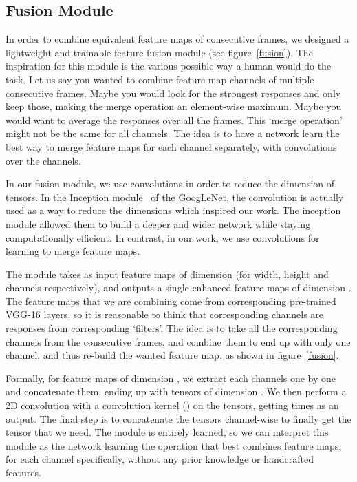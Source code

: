 \documentclass[runningheads]{llncs}
\begin{document}
\subsection{Fusion Module}
In order to combine equivalent feature maps of consecutive frames, we designed a lightweight and trainable feature fusion module (see figure~\ref{fusion}). The inspiration for this module is the various possible way a human would do the task. Let us say you wanted to combine feature map channels of multiple consecutive frames. Maybe you would look for the strongest responses and only keep those, making the merge operation an element-wise maximum. Maybe you would want to average the responses over all the frames. This `merge operation' might not be the same for all channels. The idea is to have a network learn the best way to merge feature maps for each channel separately, with  convolutions over the channels. 

In our fusion module, we use  convolutions in order to reduce the dimension of tensors. In the Inception module~\cite{szegedy2015going} of the GoogLeNet, the  convolution is actually used as a way to reduce the dimensions which inspired our work. The inception module allowed them to build a deeper and wider network while staying computationally efficient. In contrast, in our work, we use  convolutions for learning to merge feature maps. 

The module takes as input  feature maps of dimension  (for width, height and channels respectively), and outputs a single enhanced feature maps of dimension . The feature maps that we are combining come from corresponding pre-trained VGG-16 layers, so it is reasonable to think that corresponding channels are responses from corresponding `filters'. The idea is to take all the corresponding channels from the consecutive frames, and combine them to end up with only one channel, and thus re-build the wanted feature map, as shown in figure~\ref{fusion}. 

Formally, for  feature maps of dimension , we extract each  channels one by one and concatenate them, ending up with  tensors of dimension . We then perform a 2D convolution with a  convolution kernel () on the  tensors, getting  times  as an output. The final step is to concatenate the tensors channel-wise to finally get the  tensor that we need. The module is entirely learned, so we can interpret this module as the network learning the operation that best combines feature maps, for each channel specifically, without any prior knowledge or handcrafted features. 
\end{document}
